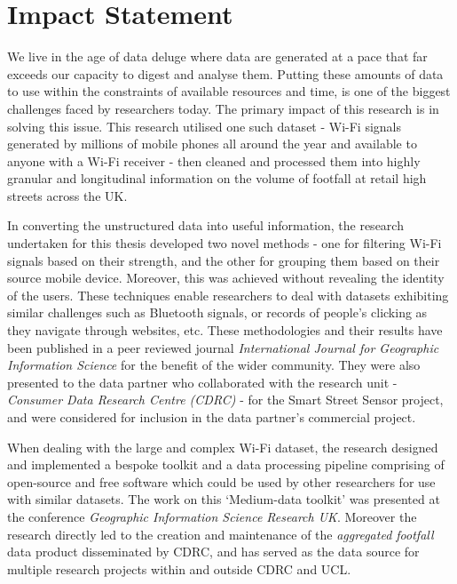\section*{Impact Statement}
We live in the age of data deluge where data are generated at a pace that far exceeds our capacity to digest and analyse them.
Putting these amounts of data to use within the constraints of available resources and time, is one of the biggest challenges faced by researchers today.
The primary impact of this research is in solving this issue.
This research utilised one such dataset - Wi-Fi signals generated by millions of mobile phones all around the year and available to anyone with a Wi-Fi receiver - then cleaned and processed them into highly granular and longitudinal information on the volume of footfall at retail high streets across the UK.

In  converting the unstructured data into useful information, the research undertaken for this thesis developed two novel methods - one for filtering Wi-Fi signals based on their strength, and the other for grouping them based on their source mobile device.
Moreover, this was achieved without revealing the identity of the users.
These techniques enable researchers to deal with datasets exhibiting similar challenges such as Bluetooth signals, or records of people's clicking as they navigate through websites, etc.
These methodologies and their results have been published in a peer reviewed journal \textit{International Journal for Geographic Information Science} for the benefit of the wider community.
They were also presented to the data partner who collaborated with the research unit - \textit{Consumer Data Research Centre (CDRC)} - for the Smart Street Sensor project, and were considered for inclusion in the data partner's commercial project.

When dealing with the large and complex Wi-Fi dataset, the research designed and implemented a bespoke toolkit and a data processing pipeline comprising of open-source and free software which could be used by other researchers for use with similar datasets.
The work on  this `Medium-data toolkit' was presented at the conference \textit{Geographic Information Science Research UK}.
Moreover the research directly led to the creation and maintenance of the \textit{aggregated footfall} data product disseminated by CDRC, and has served as the data source for multiple research projects within and outside CDRC and UCL.

